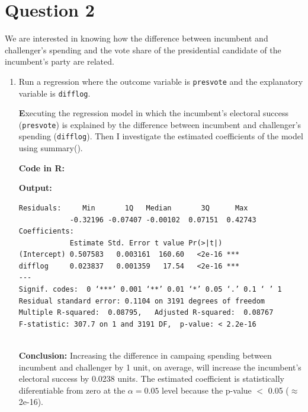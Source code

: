 \documentclass[12pt,letterpaper]{article}
\begin{document}
\newpage

\section*{Question 2}
\noindent We are interested in knowing how the difference between incumbent and challenger's spending and the vote share of the presidential candidate of the incumbent's party are related.	\vspace{.25cm}
	\begin{enumerate}
		\item Run a regression where the outcome variable is \texttt{presvote} and the explanatory variable is \texttt{difflog}.	\vspace{0.5cm}
		
			\noindent \textbf Executing the regression model in which the incumbent's electoral success (\texttt{presvote}) is explained by the difference between incumbent and challenger's spending (\texttt{difflog}). Then I investigate the estimated coefficients of the model using summary(). \vspace{0.5cm}
		
		\noindent \textbf{Code in R:}
		  
		\vspace{.25cm}
		
		\noindent \textbf{Output: }
				\begin{footnotesize}
		\begin{verbatim}
Residuals:     Min       1Q   Median       3Q      Max 
            -0.32196 -0.07407 -0.00102  0.07151  0.42743 
Coefficients:            
            Estimate Std. Error t value Pr(>|t|)    
(Intercept) 0.507583   0.003161  160.60   <2e-16 ***
difflog     0.023837   0.001359   17.54   <2e-16 ***
---
Signif. codes:  0 ‘***’ 0.001 ‘**’ 0.01 ‘*’ 0.05 ‘.’ 0.1 ‘ ’ 1
Residual standard error: 0.1104 on 3191 degrees of freedom
Multiple R-squared:  0.08795,	Adjusted R-squared:  0.08767 
F-statistic: 307.7 on 1 and 3191 DF,  p-value: < 2.2e-16
			
		\end{verbatim}  
				\end{footnotesize}
		\vspace{.25cm}
		
		\noindent \textbf{Conclusion:} Increasing the difference in campaing spending between incumbent and challenger by 1 unit, on average, will increase the incumbent's electoral success by 0.0238 units. The estimated coefficient is statistically diferentiable from zero at the  $\alpha=0.05$ level because the p-value $<$ 0.05 ($\approx $2e-16).
		\vspace{1 cm}
		

\end{enumerate}
\end{document}
